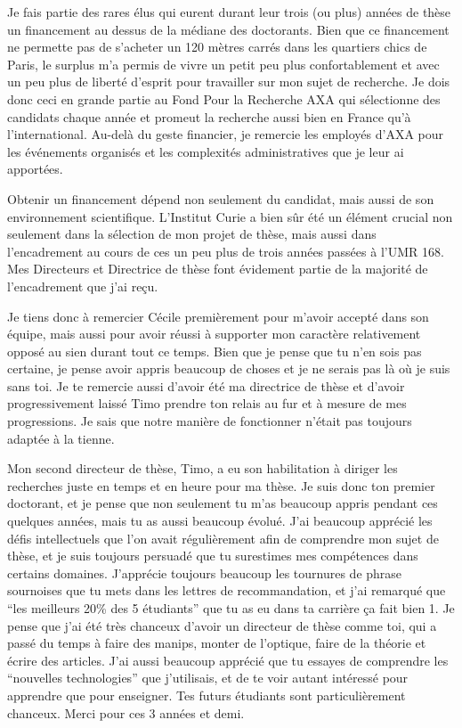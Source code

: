 \documentclass[A4paperpaper,11pt,english]{sphinxmanual}
\begin{document}
Je fais partie des rares élus qui eurent durant leur trois (ou plus) années de
thèse un financement au dessus de la médiane des doctorants. Bien que ce
financement ne permette pas de s'acheter un 120 mètres carrés dans les
quartiers chics de Paris, le surplus m'a permis de vivre un petit peu plus
confortablement et avec un peu plus de liberté d'esprit pour travailler sur mon
sujet de recherche. Je dois donc ceci en grande partie au Fond Pour la
Recherche AXA qui sélectionne des candidats chaque année et promeut la
recherche aussi bien en France qu'à l'international. Au-delà du geste
financier, je remercie les employés d'AXA pour les événements organisés et les
complexités administratives que je leur ai apportées.

Obtenir un financement dépend non seulement du candidat, mais aussi de son
environnement scientifique. L'Institut Curie a bien sûr été un élément crucial
non seulement dans la sélection de mon projet de thèse, mais aussi dans
l'encadrement au cours de ces un peu plus de trois années passées à l'UMR 168.
Mes Directeurs et Directrice de thèse font évidement partie de la majorité de
l'encadrement que j'ai reçu.

Je tiens donc à remercier Cécile premièrement pour m'avoir accepté dans son
équipe, mais aussi pour avoir réussi à supporter mon caractère relativement
opposé au sien durant tout ce temps. Bien que je pense que tu n'en sois pas
certaine, je pense avoir appris beaucoup de choses et je ne serais pas là où je
suis sans toi. Je te remercie aussi d'avoir été ma directrice de thèse et
d'avoir progressivement laissé Timo prendre ton relais au fur et à mesure de
mes progressions. Je sais que notre manière de fonctionner n'était pas toujours
adaptée à la tienne.

Mon second directeur de thèse, Timo, a eu son habilitation à diriger les
recherches juste en temps et en heure pour ma thèse. Je suis donc ton premier
doctorant, et je pense que non seulement tu m'as beaucoup appris pendant ces
quelques années, mais tu as aussi beaucoup évolué. J'ai beaucoup apprécié les
défis intellectuels que l'on avait régulièrement afin de comprendre mon sujet
de thèse, et je suis toujours persuadé que tu surestimes mes compétences dans
certains domaines. J'apprécie toujours beaucoup les tournures de phrase sournoises
que tu mets dans les lettres de recommandation, et j'ai remarqué que ``les
meilleurs 20\% des 5 étudiants'' que tu as eu dans ta carrière ça fait bien 1.
Je pense que j'ai été très chanceux d'avoir un directeur de thèse comme toi,
qui a passé du temps à faire des manips, monter de l'optique, faire de la
théorie et écrire des articles. J'ai aussi beaucoup apprécié que tu essayes de
comprendre les ``nouvelles technologies'' que j'utilisais, et de te voir autant
intéressé pour apprendre que pour enseigner. Tes futurs étudiants sont
particulièrement chanceux. Merci pour ces 3 années et demi.
\end{document}
